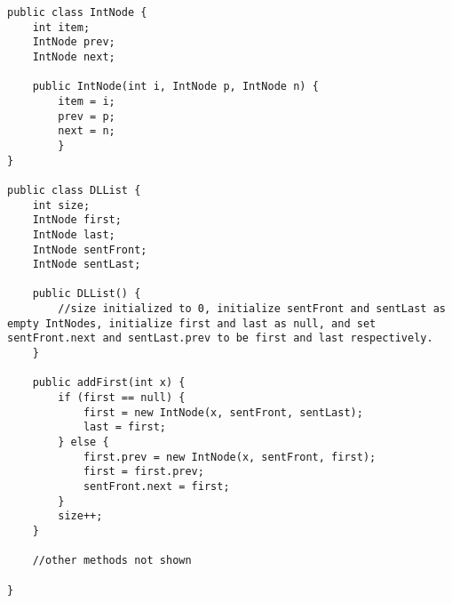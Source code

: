 \begin{lstlisting}
public class IntNode {
    int item;
    IntNode prev;
    IntNode next;
    
    public IntNode(int i, IntNode p, IntNode n) {
        item = i;
        prev = p;
        next = n;
        }
}

public class DLList {
    int size;
    IntNode first;
    IntNode last;
    IntNode sentFront;
    IntNode sentLast;
    
    public DLList() {
        //size initialized to 0, initialize sentFront and sentLast as empty IntNodes, initialize first and last as null, and set sentFront.next and sentLast.prev to be first and last respectively.
    }
    
    public addFirst(int x) {
        if (first == null) {
            first = new IntNode(x, sentFront, sentLast);
            last = first;
        } else {
            first.prev = new IntNode(x, sentFront, first);
            first = first.prev;
            sentFront.next = first;
        }
        size++;
    }
    
    //other methods not shown
    
}
\end{lstlisting}